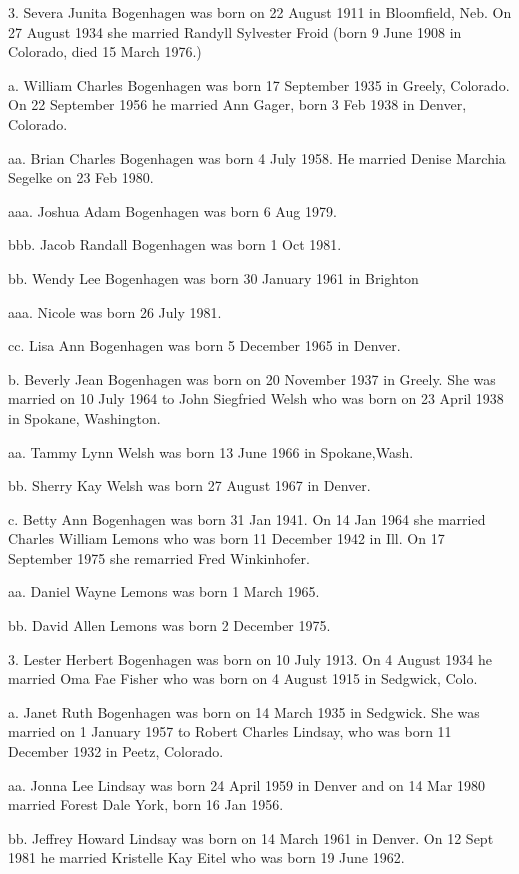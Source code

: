 \documentclass[a4paper]{article}
\begin{document}
3. Severa Junita Bogenhagen was born on 22 August 1911 in Bloomfield, Neb. On 27 August 1934 she married Randyll Sylvester Froid (born 9 June 1908 in Colorado, died 15 March 1976.)  

a. William Charles Bogenhagen was born 17 September 1935 in Greely, Colorado.  On 22 September 1956 he married Ann Gager, born 3 Feb 1938 in Denver, Colorado.
		
aa. Brian Charles Bogenhagen was born 4 July 1958.  He married Denise Marchia Segelke on 23 Feb 1980.

aaa. Joshua Adam Bogenhagen was born 6 Aug 1979.

bbb. Jacob Randall Bogenhagen was born 1 Oct 1981.

bb. Wendy Lee Bogenhagen was born 30 January 1961 in Brighton
				
aaa. Nicole was born 26 July 1981.

cc. Lisa Ann Bogenhagen was born 5 December 1965 in Denver.

b. Beverly Jean Bogenhagen was born on 20 November 1937 in Greely. She was married on 10 July 1964 to John Siegfried Welsh who was born on 23 April 1938 in Spokane, Washington.
				
aa. Tammy Lynn Welsh was born 13 June 1966 in Spokane,Wash.

bb. Sherry Kay Welsh was born 27 August 1967 in Denver.

c. Betty Ann Bogenhagen was born 31 Jan 1941.  On 14 Jan 1964 she married Charles William Lemons who was born 11 December 1942 in Ill. On 17 September  1975 she remarried Fred Winkinhofer.

aa. Daniel Wayne Lemons was born 1 March 1965.

bb. David Allen Lemons was born 2 December 1975.

3. Lester Herbert Bogenhagen was born on 10 July 1913.  On 4 August 1934 he married Oma Fae Fisher who was born on 4 August 1915 in Sedgwick, Colo.

a. Janet Ruth Bogenhagen was born on 14 March 1935 in Sedgwick. She was married on 1 January 1957 to Robert Charles Lindsay, who was born 11 December 1932 in Peetz, Colorado.
 
aa. Jonna Lee Lindsay was born 24 April 1959 in Denver and on 14 Mar 1980 married Forest Dale York, born 16 Jan 1956.
			
bb.  Jeffrey Howard Lindsay was born on 14 March 1961 in Denver.  On 12 Sept 1981 he married Kristelle Kay Eitel who was born 19 June 1962.
\end{document}
